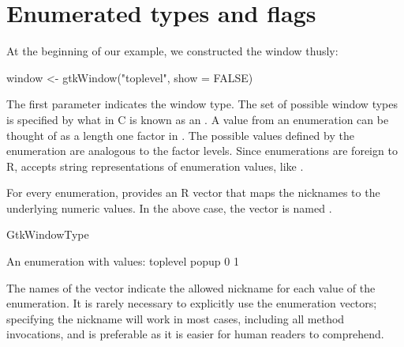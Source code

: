 
\section{Enumerated types and flags}

At the beginning of our example, we constructed the window thusly: 
\begin{Schunk}
\begin{Sinput}
 window <- gtkWindow("toplevel", show = FALSE)
\end{Sinput}
\end{Schunk}
%
The first parameter indicates the window type. The set of possible
window types is specified by what in C is known as an
. A value from an enumeration can be thought of as a
length one factor in \R. The possible values defined by the
enumeration are analogous to the factor levels.  Since enumerations
are foreign to R,  accepts string
representations of enumeration values, like . 

For every \GTK\/ enumeration,  provides an R
vector that maps the nicknames to the underlying numeric values.  In
the above case, the vector is named .
\begin{Schunk}
\begin{Sinput}
 GtkWindowType
\end{Sinput}
\begin{Soutput}
An enumeration with values:
toplevel    popup 
       0        1 
\end{Soutput}
\end{Schunk}
%
The names of the vector indicate the allowed nickname for each value
of the enumeration. It is rarely necessary to explicitly use the
enumeration vectors; specifying the nickname will work in most cases,
including all method invocations, and is preferable as it is easier
for human readers to comprehend.

